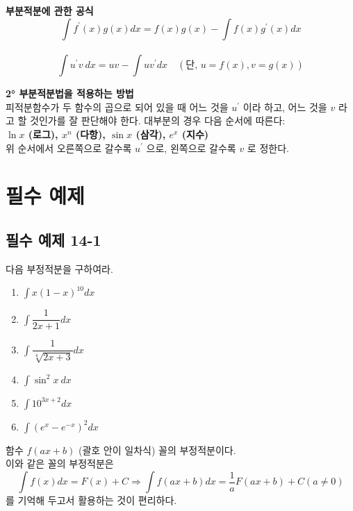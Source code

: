 \documentclass[a4paper,11pt]{article}
\begin{document}
\begin{conceptbox}[기본 정석]
\textbf{부분적분에 관한 공식} \\
\[ \int f^{\prime}(x)g(x)dx=f(x)g(x)-\int f(x)g^{\prime}(x)dx \] \\
\[ \int u^{\prime}v~dx=uv-\int uv^{\prime}dx \quad (\text{단, } u=f(x), v=g(x)) \]
\end{conceptbox}

\begin{advicebox}
\textbf{2° 부분적분법을 적용하는 방법} \\
피적분함수가 두 함수의 곱으로 되어 있을 때 어느 것을 $u^{\prime}$ 이라 하고, 어느 것을 $v$ 라고 할 것인가를 잘 판단해야 한다. 대부분의 경우 다음 순서에 따른다: \\
\textbf{$\ln x$ (로그), $x^{n}$ (다항), $\sin x$ (삼각), $e^{x}$ (지수)} \\
위 순서에서 오른쪽으로 갈수록 $u^{\prime}$ 으로, 왼쪽으로 갈수록 $v$ 로 정한다.
\end{advicebox}

\newpage

\section*{필수 예제}

\subsection*{필수 예제 14-1}
다음 부정적분을 구하여라.
\begin{enumerate}[label=(\arabic*)]
    \item $\int x(1-x)^{10}dx$
    \item $\int\dfrac{1}{2x+1}dx$
    \item $\int\dfrac{1}{\sqrt[4]{2x+3}}dx$
    \item $\int\sin^{2}x~dx$
    \item $\int10^{3x+2}dx$
    \item $\int(e^{x}-e^{-x})^{2}dx$
\end{enumerate}

\begin{studybox}
함수 $f(ax+b)$ (괄호 안이 일차식) 꼴의 부정적분이다.\\
이와 같은 꼴의 부정적분은 \[\int f(x)dx=F(x)+C \Rightarrow \int f(ax+b)dx=\dfrac{1}{a}F(ax+b)+C(a\ne0)\] 를 기억해 두고서 활용하는 것이 편리하다.
\end{studybox}
\end{document}
